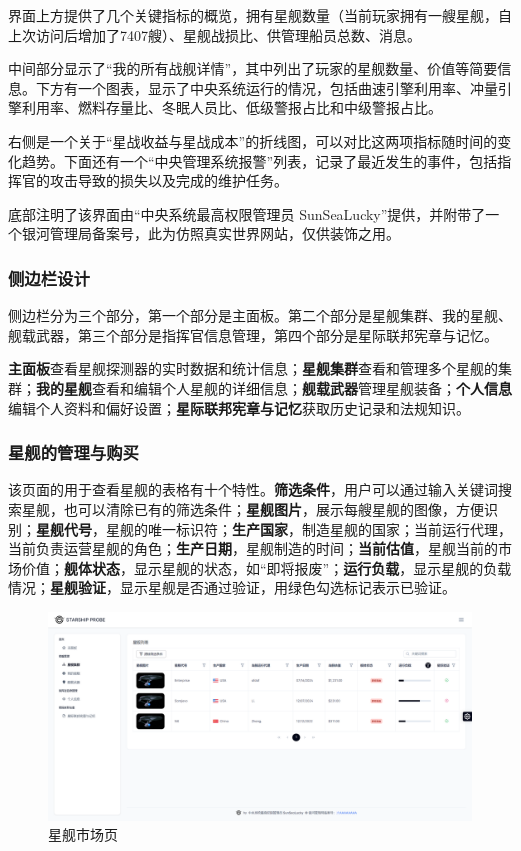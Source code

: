 \documentclass{base}
\begin{document}
界面上方提供了几个关键指标的概览，拥有星舰数量（当前玩家拥有一艘星舰，自上次访问后增加了7407艘）、星舰战损比、供管理船员总数、消息。

中间部分显示了“我的所有战舰详情”，其中列出了玩家的星舰数量、价值等简要信息。下方有一个图表，显示了中央系统运行的情况，包括曲速引擎利用率、冲量引擎利用率、燃料存量比、冬眠人员比、低级警报占比和中级警报占比。

右侧是一个关于“星战收益与星战成本”的折线图，可以对比这两项指标随时间的变化趋势。下面还有一个“中央管理系统报警”列表，记录了最近发生的事件，包括指挥官的攻击导致的损失以及完成的维护任务。

底部注明了该界面由“中央系统最高权限管理员 SunSeaLucky”提供，并附带了一个银河管理局备案号，此为仿照真实世界网站，仅供装饰之用。

\subsubsection{侧边栏设计}
侧边栏分为三个部分，第一个部分是主面板。第二个部分是星舰集群、我的星舰、舰载武器，第三个部分是指挥官信息管理，第四个部分是星际联邦宪章与记忆。

\textbf{主面板}查看星舰探测器的实时数据和统计信息；\textbf{星舰集群}查看和管理多个星舰的集群；\textbf{我的星舰}查看和编辑个人星舰的详细信息；\textbf{舰载武器}管理星舰装备；\textbf{个人信息}编辑个人资料和偏好设置；\textbf{星际联邦宪章与记忆}获取历史记录和法规知识。

\subsubsection{星舰的管理与购买}

该页面的用于查看星舰的表格有十个特性。\textbf{筛选条件}，用户可以通过输入关键词搜索星舰，也可以清除已有的筛选条件；\textbf{星舰图片}，展示每艘星舰的图像，方便识别；\textbf{星舰代号}，星舰的唯一标识符；\textbf{生产国家}，制造星舰的国家；当前运行代理，当前负责运营星舰的角色；\textbf{生产日期}，星舰制造的时间；\textbf{当前估值}，星舰当前的市场价值；\textbf{舰体状态}，显示星舰的状态，如“即将报废”；\textbf{运行负载}，显示星舰的负载情况；\textbf{星舰验证}，显示星舰是否通过验证，用绿色勾选标记表示已验证。

\begin{figure}[H]
	\centering
	\includegraphics[width=\linewidth]{images/StarshipMarket}
	\caption{星舰市场页}
	\label{fig:starshipmarket}
\end{figure}
\end{document}
